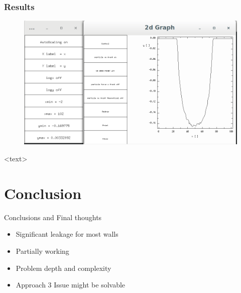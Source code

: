 \documentclass{beamer}
\begin{document}
\begin{frame}
\frametitle{Results}
\begin{figure}
\includegraphics[scale=0.2]{A2p3}
\caption{}
\end{figure}
<text>
\end{frame}
\section{Conclusion}
\begin{frame}{Conclusions and Final thoughts}

\begin{itemize}
  \item Significant leakage for most walls
  \item Partially working
  \item Problem depth and complexity
  \item Approach 3 Issue might be solvable   
\end{itemize}

\vskip 1cm

\end{frame}
\end{document}
